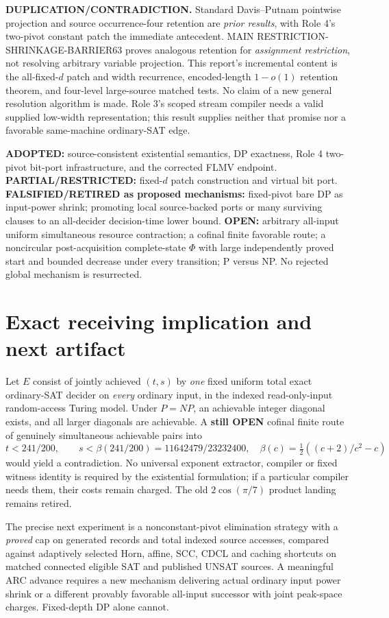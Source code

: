 \documentclass[11pt]{article}
\begin{document}
\noindent\textbf{DUPLICATION/CONTRADICTION.} Standard Davis--Putnam pointwise projection and source occurrence-four retention are \emph{prior results}, with Role 4's two-pivot constant patch the immediate antecedent. MAIN RESTRICTION-SHRINKAGE-BARRIER63 proves analogous retention for \emph{assignment restriction}, not resolving arbitrary variable projection. This report's incremental content is the all-fixed-$d$ patch and width recurrence, encoded-length $1-o(1)$ retention theorem, and four-level large-source matched tests. No claim of a new general resolution algorithm is made. Role 3's scoped stream compiler needs a valid supplied low-width representation; this result supplies neither that promise nor a favorable same-machine ordinary-SAT edge.

\noindent\textbf{ADOPTED:} source-consistent existential semantics, DP exactness, Role 4 two-pivot bit-port infrastructure, and the corrected FLMV endpoint. \textbf{PARTIAL/RESTRICTED:} fixed-$d$ patch construction and virtual bit port. \textbf{FALSIFIED/RETIRED as proposed mechanisms:} fixed-pivot bare DP as input-power shrink; promoting local source-backed ports or many surviving clauses to an all-decider decision-time lower bound. \textbf{OPEN:} arbitrary all-input uniform simultaneous resource contraction; a cofinal finite favorable route; a noncircular post-acquisition complete-state $\Phi$ with large independently proved start and bounded decrease under every transition; P versus NP. No rejected global mechanism is resurrected.

\section{Exact receiving implication and next artifact}
Let $E$ consist of jointly achieved $(t,s)$ by \emph{one} fixed uniform total exact ordinary-SAT decider on \emph{every} ordinary input, in the indexed read-only-input random-access Turing model. Under $P=NP$, an achievable integer diagonal exists, and all larger diagonals are achievable. A \textbf{still OPEN} cofinal finite route of genuinely simultaneous achievable pairs into
\[
 t<241/200,\qquad s<\beta(241/200)=11642479/23232400,\quad
 \beta(c)=\tfrac12((c+2)/c^2-c)
\]
would yield a contradiction. No universal exponent extractor, compiler or fixed witness identity is required by the existential formulation; if a particular compiler needs them, their costs remain charged. The old $2\cos(\pi/7)$ product landing remains retired.

The precise next experiment is a nonconstant-pivot elimination strategy with a \emph{proved} cap on generated records and total indexed source accesses, compared against adaptively selected Horn, affine, SCC, CDCL and caching shortcuts on matched connected eligible SAT and published UNSAT sources. A meaningful ARC advance requires a new mechanism delivering actual ordinary input power shrink or a different provably favorable all-input successor with joint peak-space charges. Fixed-depth DP alone cannot.
\end{document}
